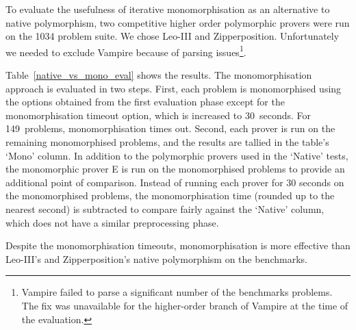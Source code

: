 \documentclass[runningheads]{llncs}
\begin{document}
To evaluate the usefulness of iterative monomorphisation as an alternative to native polymorphism, two competitive higher order polymorphic provers were run on the 1034 problem suite. We chose Leo-III and Zipperposition. Unfortunately we needed to exclude Vampire because of parsing issues\footnote{Vampire failed to parse a significant number of the benchmarks problems. The fix was unavailable for the higher-order branch of Vampire at the time of the evaluation.}.

Table~\ref{native_vs_mono_eval} shows the results.
The monomorphisation approach is evaluated in two steps. First, each problem is monomorphised using the options obtained from the first evaluation phase except for the monomorphisation timeout option, which is increased to 30~seconds. For 149~problems, monomorphisation times out. Second, each prover is run on the remaining monomorphised problems, and the results are tallied in the table's `Mono' column. In addition to the polymorphic provers used in the `Native' tests, the monomorphic prover E is run on the monomorphised problems to provide an additional point of comparison. Instead of running each prover for 30 seconds on the monomorphised problems, the monomorphisation time (rounded up to the nearest second) is subtracted to compare fairly against the `Native' column, which does not have a similar preprocessing phase.

Despite the monomorphisation timeouts, monomorphisation is more effective than Leo-III's and Zipperposition's native polymorphism on the benchmarks.


%
%
%    
\end{document}
